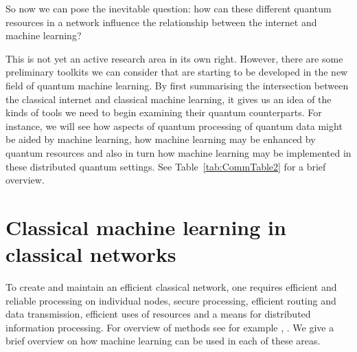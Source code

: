 \documentclass[twocolumn, aps, rmp, amsmath, amssymb, nofootinbib, superscriptaddress, longbibliography, floatfix, table-of-contents, eqsecnum]{revtex4-2}
\begin{document}
So now we can pose the inevitable question: how can these different quantum resources in a network influence the relationship between the internet and machine learning?

This is not yet an active research area in its own right. However, there are some preliminary toolkits we can consider that are starting to be developed in the new field of quantum machine learning. By first summarising the intersection between the classical internet and classical machine learning, it gives us an idea of the kinds of tools we need to begin examining their quantum counterparts. For instance, we will see how aspects of quantum processing of quantum data might be aided by machine learning, how machine learning may be enhanced by quantum resources and also in turn how machine learning may be implemented in these distributed quantum settings. See Table~\eqref{tab:CommTable2} for a brief overview. 

\section{Classical machine learning in classical networks}
 To create and maintain an efficient classical network, one requires efficient and reliable processing on individual nodes, secure processing, efficient routing and data transmission, efficient uses of resources and a means for distributed information processing. For overview of methods see for example \cite{boutaba2018comprehensive}, \cite{wang2018machine}.  We give a brief overview on how machine learning can be used in each of these areas. 
\end{document}
